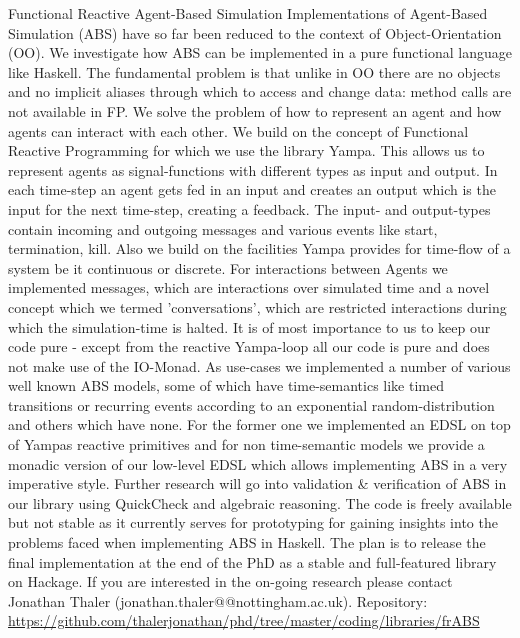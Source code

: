 \begin{hcarentry}[new]{Functional Reactive Agent-Based Simulation}
\makeheader
Implementations of Agent-Based Simulation (ABS) have so far been reduced to
the context of Object-Orientation (OO). We investigate how ABS can be
implemented in a pure functional language like Haskell. The fundamental
problem is that unlike in OO there are no objects and no implicit aliases
through which to access and change data: method calls are not available in FP.
We solve the problem of how to represent an agent and how agents can interact
with each other. We build on the concept of Functional Reactive Programming
for which we use the library Yampa. This allows us to represent agents as
signal-functions with different types as input and output. In each time-step
an agent gets fed in an input and creates an output which is the input for the
next time-step, creating a feedback. The input- and output-types contain
incoming and outgoing messages and various events like start, termination,
kill. Also we build on the facilities Yampa provides for time-flow of a system
be it continuous or discrete. For interactions between Agents we implemented
messages, which are interactions over simulated time and a novel concept which
we termed 'conversations', which are restricted interactions during which the
simulation-time is halted. It is of most importance to us to keep our code
pure - except from the reactive Yampa-loop all our code is pure and does not
make use of the IO-Monad. 
As use-cases we implemented a number of various well known ABS models, some of
which have time-semantics like timed transitions or recurring events according 
to an exponential random-distribution and others which have none.
For the former one we implemented an EDSL on top of Yampas reactive
primitives and for non time-semantic models we provide a monadic version of
our low-level EDSL which allows implementing ABS in a very imperative style.
Further research will go into validation \& verification of ABS in our library using QuickCheck and
algebraic reasoning. The code is freely available but not stable as it
currently serves for prototyping for gaining insights into the problems faced
when implementing ABS in Haskell. The plan is to release the final
implementation at the end of the PhD as a stable and full-featured library on
Hackage. If you are interested in the on-going research please contact
Jonathan Thaler (jonathan.thaler@@nottingham.ac.uk).
\FurtherReading
  Repository: \url{https://github.com/thalerjonathan/phd/tree/master/coding/libraries/frABS}
\end{hcarentry}